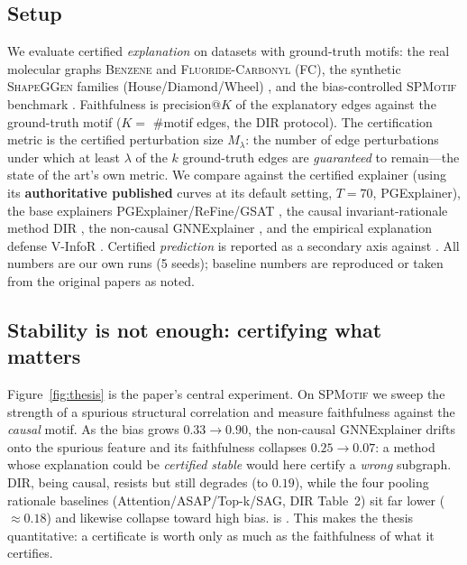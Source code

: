 
\subsection{Setup}
We evaluate certified \emph{explanation} on datasets with ground-truth motifs:
the real molecular graphs \textsc{Benzene} and \textsc{Fluoride-Carbonyl} (FC),
the synthetic \textsc{ShapeGGen} families (House/Diamond/Wheel)
\cite{agarwal2023graphxai}, and the bias-controlled \textsc{SPMotif} benchmark
\cite{wu2022dir}. Faithfulness is precision@$K$ of the
explanatory edges against the ground-truth motif ($K{=}$ \#motif edges, the
DIR protocol). The certification metric is the certified perturbation size
$M_\lambda$: the number of edge perturbations under which at least $\lambda$ of
the $k$ ground-truth edges are \emph{guaranteed} to remain---the state of the
art's own metric. We compare against the certified explainer \xgn{}
\cite{li2025xgnncert} (using its \textbf{authoritative published} curves at its
default setting, $T{=}70$, PGExplainer), the base explainers
PGExplainer/ReFine/GSAT \cite{luo2020pgexplainer,wang2021refine,miao2022gsat},
the causal invariant-rationale method DIR \cite{wu2022dir}, the non-causal
GNNExplainer \cite{ying2019gnnexplainer}, and the empirical explanation defense
\textcolor{vinfomag}{V-InfoR} \cite{wang2023vinfor}. Certified \emph{prediction}
is reported as a secondary axis against \pgn{} \cite{li2025pgnncert}. All \aeth{} numbers are our own
runs (5 seeds); baseline numbers are reproduced or taken from the original
papers as noted.

\subsection{Stability is not enough: certifying what matters}
\label{sec:exp-thesis}
Figure~\ref{fig:thesis} is the paper's central experiment. On \textsc{SPMotif}
we sweep the strength of a spurious structural correlation and measure
faithfulness against the \emph{causal} motif. As the bias grows
$0.33\!\to\!0.90$, the non-causal \textcolor{vinfomag}{GNNExplainer drifts onto
the spurious feature and its faithfulness collapses $0.25\!\to\!0.07$}: a method
whose explanation could be \emph{certified stable} would here certify a
\emph{wrong} subgraph. DIR, being causal, resists but still degrades (to $0.19$),
while the four pooling rationale baselines (Attention/ASAP/Top-k/SAG, DIR
Table~2) sit far lower ($\approx0.18$) and likewise collapse toward high bias.
\aeth{} is . This makes the thesis quantitative: a certificate is worth
only as much as the faithfulness of what it certifies.

